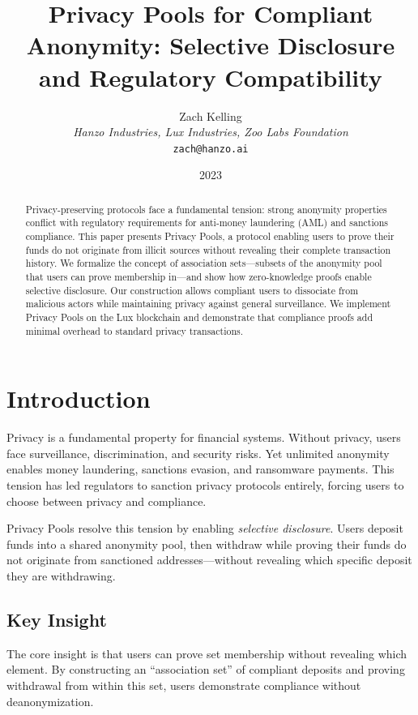 \documentclass[11pt,a4paper]{article}
\title{Privacy Pools for Compliant Anonymity: Selective Disclosure and Regulatory Compatibility}
\author{Zach Kelling\\
\textit{Hanzo Industries, Lux Industries, Zoo Labs Foundation}\\
\texttt{zach@hanzo.ai}}
\date{2023}
\theoremstyle{definition}
\begin{document}
\maketitle

\begin{abstract}
Privacy-preserving protocols face a fundamental tension: strong anonymity properties conflict with regulatory requirements for anti-money laundering (AML) and sanctions compliance. This paper presents Privacy Pools, a protocol enabling users to prove their funds do not originate from illicit sources without revealing their complete transaction history. We formalize the concept of association sets---subsets of the anonymity pool that users can prove membership in---and show how zero-knowledge proofs enable selective disclosure. Our construction allows compliant users to dissociate from malicious actors while maintaining privacy against general surveillance. We implement Privacy Pools on the Lux blockchain and demonstrate that compliance proofs add minimal overhead to standard privacy transactions.
\end{abstract}

\section{Introduction}

Privacy is a fundamental property for financial systems. Without privacy, users face surveillance, discrimination, and security risks. Yet unlimited anonymity enables money laundering, sanctions evasion, and ransomware payments. This tension has led regulators to sanction privacy protocols entirely, forcing users to choose between privacy and compliance.

Privacy Pools resolve this tension by enabling \textit{selective disclosure}. Users deposit funds into a shared anonymity pool, then withdraw while proving their funds do not originate from sanctioned addresses---without revealing which specific deposit they are withdrawing.

\subsection{Key Insight}

The core insight is that users can prove set membership without revealing which element. By constructing an ``association set'' of compliant deposits and proving withdrawal from within this set, users demonstrate compliance without deanonymization.
\end{document}
